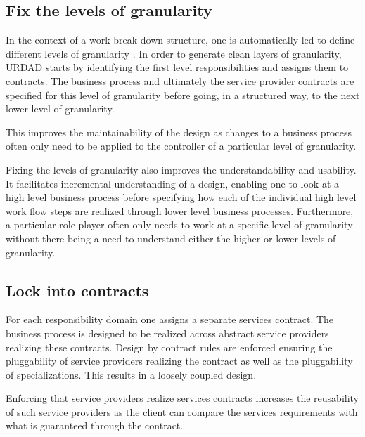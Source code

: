 \documentclass{IOS-Book-Article}
\begin{document}

\subsection{Fix the levels of granularity}

In the context of a work break down structure, one is automatically led to define different levels of granularity
\cite{demarco:structuredAnalysis}. In order to generate clean layers of granularity, URDAD starts by identifying the first
level responsibilities and assigns them to contracts. The business process
and ultimately the service provider contracts are specified for this level of granularity before going, 
in a structured way, to the next lower level of granularity.

This improves the maintainability of the design as changes to a business process often only need to be applied to the
controller of a particular level of granularity. 

Fixing the levels of granularity also improves the understandability and usability. It facilitates incremental understanding of 
a design, enabling one to look at a high level business process before specifying how each of the individual high level
work flow steps are realized through lower level business processes. Furthermore, a particular role player often only
needs to work at a specific level of granularity without there being a need to understand either the higher or lower levels
of granularity.


\subsection{Lock into contracts}

For each responsibility domain one assigns a separate services contract.
The business process is designed to be realized across abstract service providers realizing these contracts.
Design by contract rules are enforced ensuring the pluggability of service providers realizing the contract
as well as the pluggability of specializations. This results in a loosely coupled design.

Enforcing that service providers realize services contracts increases the reusability of such service providers
as the client can compare the services requirements with what is guaranteed through the contract.
\end{document}
